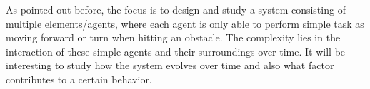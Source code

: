 As pointed out before, the focus is to design and study a system consisting of multiple elements/agents, where 
each agent is only able to perform simple task as moving forward or turn when hitting an obstacle. The 
complexity lies in the interaction of these simple agents and their surroundings over time. It will be 
interesting to study how the system evolves over time and also what factor contributes to a certain behavior. 
